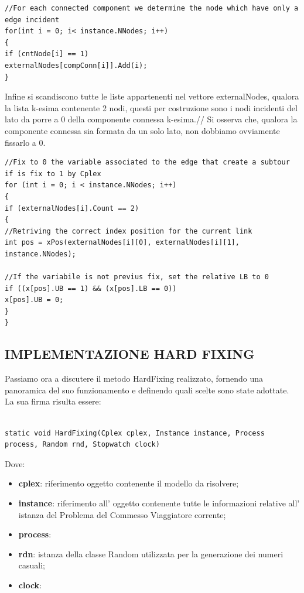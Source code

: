 \documentclass[11pt]{article}
\begin{document}
\begin{lstlisting}    
//For each connected component we determine the node which have only a edge incident 
for(int i = 0; i< instance.NNodes; i++)
{
if (cntNode[i] == 1)
externalNodes[compConn[i]].Add(i);
}
\end{lstlisting}

Infine si scandiscono tutte le liste appartenenti nel vettore externalNodes, qualora la lista k-esima contenente 2 nodi, questi per costruzione sono i nodi incidenti del lato da porre a 0 della componente connessa k-esima.//
Si osserva che, qualora la componente connessa sia formata da un solo lato, non dobbiamo ovviamente fissarlo a 0. 

\begin{lstlisting}  
//Fix to 0 the variable associated to the edge that create a subtour if is fix to 1 by Cplex
for (int i = 0; i < instance.NNodes; i++)
{
if (externalNodes[i].Count == 2)
{
//Retriving the correct index position for the current link 
int pos = xPos(externalNodes[i][0], externalNodes[i][1], instance.NNodes);

//If the variabile is not previus fix, set the relative LB to 0
if ((x[pos].UB == 1) && (x[pos].LB == 0))
x[pos].UB = 0;
}
}

\end{lstlisting}

\subsection*{IMPLEMENTAZIONE HARD FIXING}

Passiamo ora a discutere il metodo HardFixing realizzato, fornendo una panoramica del suo funzionamento e definendo quali scelte sono state adottate. La sua firma risulta essere:

\begin{lstlisting}

static void HardFixing(Cplex cplex, Instance instance, Process process, Random rnd, Stopwatch clock)

\end{lstlisting}

Dove:

\begin{itemize}
    \item \textbf{cplex}: riferimento oggetto contenente il modello da risolvere;
    \item \textbf{instance}: riferimento all' oggetto contenente tutte le informazioni relative all' istanza del Problema del Commesso Viaggiatore corrente;
    \item \textbf{process}: 
    \item \textbf{rdn}: istanza della classe Random utilizzata per la generazione dei numeri casuali;
    \item \textbf{clock}: 
\end{itemize}
\end{document}
